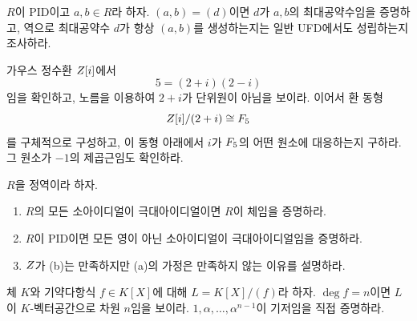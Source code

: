 \begin{exercise}[*]
$R$이 PID이고 $a,b\in R$라 하자. $(a,b)=(d)$이면 $d$가 $a,b$의 최대공약수임을 증명하고, 역으로 최대공약수 $d$가 항상 $(a,b)$를 생성하는지는 일반 UFD에서도 성립하는지 조사하라.
\end{exercise}

\begin{exercise}[*]
가우스 정수환 $Z[i]$에서
\[
  5=(2+i)(2-i)
\]
임을 확인하고, 노름을 이용하여 $2+i$가 단위원이 아님을 보이라. 이어서 환 동형
\[
  Z[i]/(2+i)\cong F_5
\]
를 구체적으로 구성하고, 이 동형 아래에서 $i$가 $F_5$의 어떤 원소에 대응하는지 구하라. 그 원소가 $-1$의 제곱근임도 확인하라.
\end{exercise}

\begin{exercise}[*]
$R$을 정역이라 하자.
\begin{enumerate}[label=(\alph*)]
  \item $R$의 모든 소아이디얼이 극대아이디얼이면 $R$이 체임을 증명하라.
  \item $R$이 PID이면 모든 영이 아닌 소아이디얼이 극대아이디얼임을 증명하라.
  \item $Z$가 (b)는 만족하지만 (a)의 가정은 만족하지 않는 이유를 설명하라.
\end{enumerate}
\end{exercise}

\begin{exercise}
체 $K$와 기약다항식 $f\in K[X]$에 대해 $L=K[X]/(f)$라 하자. $\deg f=n$이면 $L$이 $K$-벡터공간으로 차원 $n$임을 보이라. $1,\alpha,\dots,\alpha^{n-1}$이 기저임을 직접 증명하라.
\end{exercise}
